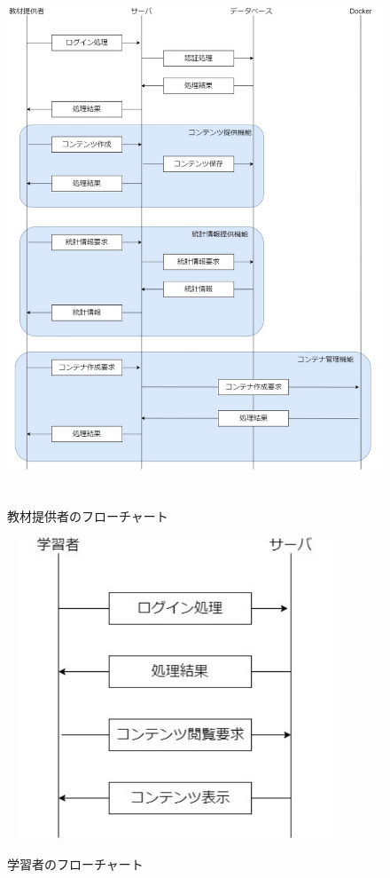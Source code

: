 \begin{figure}[htbp]
    \begin{center}
        \includegraphics[width=16cm,height=15cm,keepaspectratio]{provider_flow-crop.pdf}\\
    \end{center}
    \caption{教材提供者のフローチャート}
    \label{provider_flow}
\end{figure}

\begin{figure}[htbp]
    \begin{center}
        \includegraphics[width=10cm,height=9cm,keepaspectratio]{learn_flow-crop.pdf}\\
    \end{center}
    \caption{学習者のフローチャート}
    \label{provider_flow}
\end{figure}